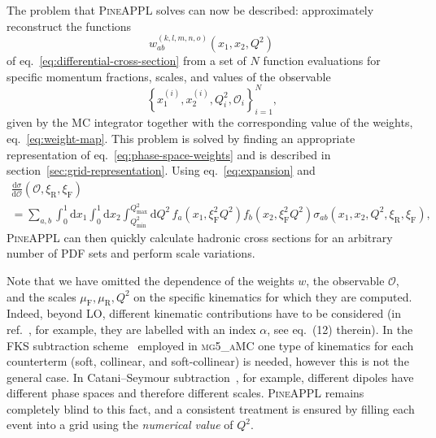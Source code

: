 The problem that \textsc{PineAPPL} solves can now be described: approximately reconstruct the functions
\begin{equation}
w_{ab}^{(k,l,m,n,o)} \left( x_1, x_2, Q^2 \right)
\label{eq:weight-map}
\end{equation}
of eq.~\eqref{eq:differential-cross-section} from a set of $N$ function evaluations for specific momentum fractions, scales, and values of the observable
\begin{equation}
\left\{ x_1^{(i)}, x_2^{(i)}, Q^2_i, \mathcal{O}_i \right\}_{i=1}^N \text{,} \label{eq:phase-space-weights}
\end{equation}
given by the MC integrator together with the corresponding value of the weights, eq.~\eqref{eq:weight-map}.
This problem is solved by finding an appropriate representation of eq.~\eqref{eq:phase-space-weights} and is described in section~\ref{sec:grid-representation}.
Using eq.~\eqref{eq:expansion} and
\begin{multline}
\frac{\mathrm{d} \sigma}{\mathrm{d} \mathcal{O}} (\mathcal{O}, \xi_\mathrm{R}, \xi_\mathrm{F}) \\
= \sum_{a,b} \int_0^1 \mathrm{d} x_1 \int_0^1 \mathrm{d} x_2 \int_{Q^2_\mathrm{min}}^{Q^2_\mathrm{max}} \mathrm{d} Q^2 \, f_a (x_1, \xi_\mathrm{F}^2 Q^2) f_b (x_2, \xi_\mathrm{F}^2 Q^2) \sigma_{ab} (x_1, x_2, Q^2, \xi_\mathrm{R}, \xi_\mathrm{F}) \text{,}
\label{eq:pineappl-convolution}
\end{multline}
\textsc{PineAPPL} can then quickly calculate hadronic cross sections for an arbitrary number of PDF sets and perform scale variations.

Note that we have omitted the dependence of the weights $w$, the observable $\mathcal{O}$, and the scales $\mu_\mathrm{F}, \mu_\mathrm{R}, Q^2$ on the specific kinematics for which they are computed.
Indeed, beyond LO, different kinematic contributions have to be considered (in ref.~\cite{Bertone:2014zva}, for example, they are labelled with an index $\alpha$, see eq.~(12) therein).
In the FKS subtraction scheme~\cite{Frixione:1995ms,Frixione:1997np} employed in \textsc{mg5\_aMC} one type of kinematics for each counterterm (soft, collinear, and soft-collinear) is needed, however this is not the general case.
In Catani--Seymour subtraction~\cite{Catani:1996jh,Catani:2002hc}, for example, different dipoles have different phase spaces and therefore different scales.
\textsc{PineAPPL} remains completely blind to this fact, and a consistent treatment is ensured by filling each event into a grid using the \emph{numerical value} of $Q^2$.

